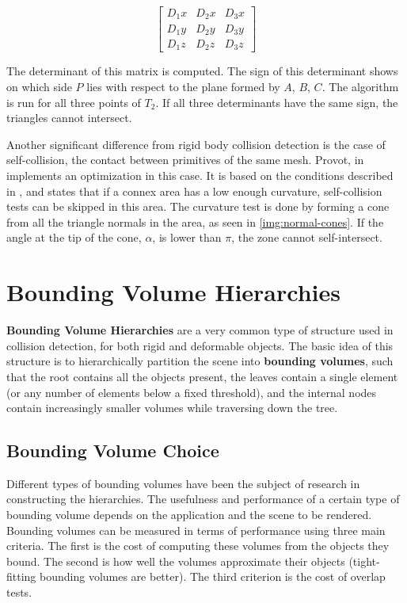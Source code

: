 \[
\begin{bmatrix}
	D_{1}x & D_{2}x & D_{3}x \\
	D_{1}y & D_{2}y & D_{3}y \\
	D_{1}z & D_{2}z & D_{3}z
\end{bmatrix}
\]

The determinant of this matrix is computed. The sign of this determinant shows on which side $P$ lies with  respect to the plane formed by $A$, $B$, $C$. The algorithm is run for all three points of $T_{2}$. If all three determinants have the same sign, the triangles cannot intersect.


\label{lab:ncones}
Another significant difference from rigid body collision detection is the case of self-collision, the contact between primitives of the same mesh. Provot, in \citep{provot97} implements an optimization in this case. It is based on the conditions described in \citep{vmt94}, and states that if a connex area has a low enough curvature, self-collision tests can be skipped in this area. The curvature test is done by forming a cone from all the triangle normals in the area, as seen in \autoref{img:normal-cones}. If the angle at the tip of the cone, $\alpha$, is lower than $\pi$, the zone cannot self-intersect.

\section{Bounding Volume Hierarchies}
\label{sec:bvh}

\textbf{Bounding Volume Hierarchies} are a very common type of structure used in collision detection, for both rigid and deformable objects. The basic idea of this structure is to hierarchically partition the scene into \textbf{bounding volumes}, such that the root contains all the objects present, the leaves contain a single element (or any number of elements below a fixed threshold), and the internal nodes contain increasingly smaller volumes while traversing down the tree.

\subsection{Bounding Volume Choice}
\label{sub-sec:bvc}

Different types of bounding volumes have been the subject of research in constructing the hierarchies. The usefulness and performance of a certain type of bounding volume depends on the application and the scene to be rendered. Bounding volumes can be measured in terms of performance using three main criteria. The first is the cost of computing these volumes from the objects they bound. The second is how well the volumes approximate their objects (tight-fitting bounding volumes are better). The third criterion is the cost of overlap tests.


